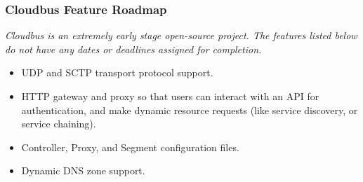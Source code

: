 \begin{frame}
	\frametitle{Cloudbus Feature Roadmap}
	\emph{Cloudbus is an extremely early stage open-source project. The features listed below do not have any dates or deadlines assigned for 
	completion.}\vspace{1em}
	\begin{itemize}
		\item UDP and SCTP transport protocol support.
		\item HTTP gateway and proxy so that users can interact with an API for authentication, and make dynamic resource requests (like service %
		discovery, or service chaining).
		\item Controller, Proxy, and Segment configuration files.
		\item Dynamic DNS zone support.
		
	\end{itemize}
\end{frame}